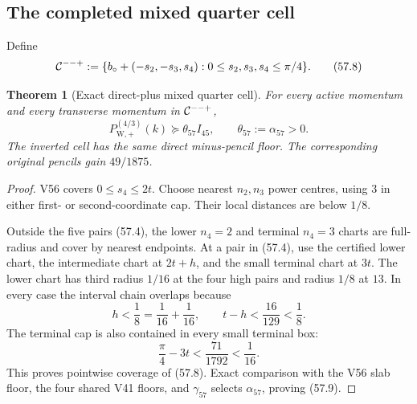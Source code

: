 \documentclass[11pt,oneside]{article}
\newtheorem{theorem}{Theorem}[section]
\theoremstyle{definition}
\theoremstyle{remark}
\begin{document}
\subsection{The completed mixed quarter cell}

Define
\[
 {\cal C}^{--+}:=
 \{b_\circ+(-s_2,-s_3,s_4):
 0\le s_2,s_3,s_4\le\pi/4\}.                         \tag{57.8}
\]

\begin{theorem}[Exact direct-plus mixed quarter cell]
\label{thm:newv57-quarter-cell}
For every active momentum and every transverse momentum in
\({\cal C}^{--+}\),
\[
 P_{\mathrm W,+}^{(4/3)}(k)
 \succeq\theta_{57}I_{45},\qquad
 \theta_{57}:=\alpha_{57}>0.                          \tag{57.9}
\]
The inverted cell has the same direct minus-pencil floor.  The
corresponding original pencils gain \(49/1875\).
\end{theorem}

\begin{proof}
V56 covers \(0\le s_4\le2t\).  Choose nearest \(n_2,n_3\) power
centres, using \(3\) in either first- or second-coordinate cap.
Their local distances are below \(1/8\).

Outside the five pairs (57.4), the lower \(n_4=2\) and terminal
\(n_4=3\) charts are full-radius and cover by nearest endpoints.
At a pair in (57.4), use the certified lower chart, the intermediate
chart at \(2t+h\), and the small terminal chart at \(3t\).
The lower chart has third radius \(1/16\) at the four high pairs
and radius \(1/8\) at \(13\).  In every case the interval chain
overlaps because
\[
 h<\frac18=\frac1{16}+\frac1{16},\qquad
 t-h<\frac{16}{129}<\frac18.                         \tag{57.10}
\]
The terminal cap is also contained in every small terminal box:
\[
 \frac{\pi}{4}-3t<\frac{71}{1792}<\frac1{16}.         \tag{57.11}
\]
This proves pointwise coverage of (57.8).  Exact comparison with
the V56 slab floor, the four shared V41 floors, and
\(\gamma_{57}\) selects \(\alpha_{57}\), proving (57.9).
\end{proof}
\end{document}
